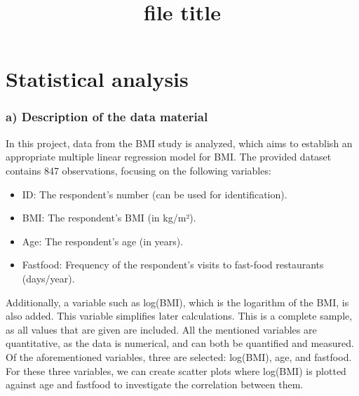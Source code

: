 \documentclass{rapport}
\title{file title} %
\begin{document}
\onehalfspacing


\subject{Subject} %


        
\buildmargins %
\buildcover %
\toc %

\section{Statistical analysis}
\subsubsection*{\textbf{a)} Description of the data material}
\noindent
In this project, data from the BMI study is analyzed, which aims to establish an appropriate multiple linear regression model for BMI. The provided dataset contains 847 observations, focusing on the following variables:

\begin{itemize}
    \item ID: The respondent's number (can be used for identification).
    \item BMI: The respondent's BMI (in kg/m²).
    \item Age: The respondent's age (in years).
    \item Fastfood: Frequency of the respondent's visits to fast-food restaurants (days/year).
\end{itemize}

\noindent
Additionally, a variable such as log(BMI), which is the logarithm of the BMI, is also added. This variable simplifies later calculations.
\noindent
This is a complete sample, as all values that are given are included. All the mentioned variables are quantitative, as the data is numerical, and can both be quantified and measured. Of the aforementioned variables, three are selected: log(BMI), age, and fastfood.
\noindent
For these three variables, we can create scatter plots where log(BMI) is plotted against age and fastfood to investigate the correlation between them.
\end{document}
